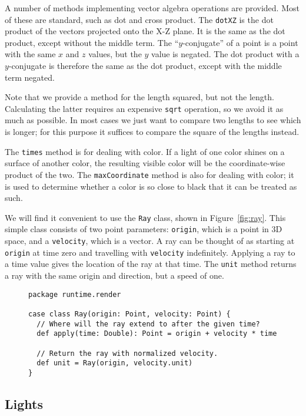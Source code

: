 A number of methods implementing vector algebra operations are provided.
Most of these are standard, such as dot and cross product.
The \verb!dotXZ! is the dot product of the vectors
projected onto the X-Z plane.
It is the same as the dot product, except without the middle term.
The ``$y$-conjugate'' of a point is a point with the same $x$ and $z$ values,
but the $y$ value is negated.
The dot product with a $y$-conjugate is therefore the same as the dot product,
except with the middle term negated.

Note that we provide a method for the length squared, but not the length.
Calculating the latter requires an expensive \verb!sqrt! operation,
so we avoid it as much as possible.
In most cases we just want to compare two lengths to see which is longer;
for this purpose it suffices to compare the square of the lengths instead.

The \verb!times! method is for dealing with color.
If a light of one color shines on a surface of another color,
the resulting visible color will be the coordinate-wise product of the two.
The \verb!maxCoordinate! method is also for dealing with color;
it is used to determine whether a color is so close to black
that it can be treated as such.

We will find it convenient to use the \verb!Ray! class,
shown in Figure~\ref{fig:ray}.
This simple class consists of two point parameters:
\verb!origin!, which is a point in 3D space,
and a \verb!velocity!, which is a vector.
A ray can be thought of as starting at \verb!origin! at time zero
and travelling with \verb!velocity! indefinitely.
Applying a ray to a time value gives the location of the ray at that time.
The \verb!unit! method returns a ray with the same origin and direction,
but a speed of one.

\begin{figure}
\begin{verbatim}
package runtime.render

case class Ray(origin: Point, velocity: Point) {
  // Where will the ray extend to after the given time?
  def apply(time: Double): Point = origin + velocity * time

  // Return the ray with normalized velocity.
  def unit = Ray(origin, velocity.unit)
}
\end{verbatim}
\getcaption
\end{figure}


\subsection{Lights\label{sec:lights}}

